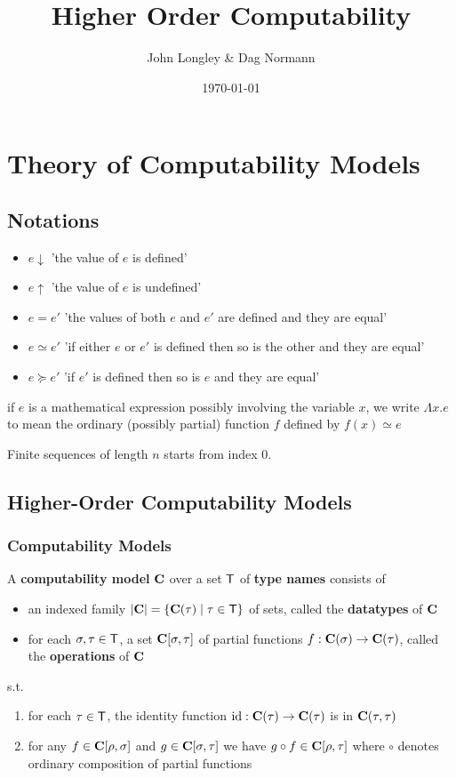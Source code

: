\documentclass[11pt]{article}
\author{John Longley \& Dag Normann}
\date{\today}
\title{Higher Order Computability}
\begin{document}
\maketitle
\tableofcontents


\section{Theory of Computability Models}
\label{sec:orga9b4bc4}
\subsection{Notations}
\label{sec:orgc508af1}
\begin{itemize}
\item \(e\downarrow\) 'the value of \(e\) is defined'
\item \(e\uparrow\) 'the value of \(e\) is undefined'
\item \(e=e'\) 'the values of both \(e\) and \(e'\) are defined and they are equal'
\item \(e\simeq e'\) 'if either \(e\) or \(e'\) is defined then so is the other and they are equal'
\item \(e\succeq e'\) 'if \(e'\) is defined then so is \(e\) and they are equal'
\end{itemize}


if \(e\) is a mathematical expression possibly involving the variable \(x\), we write \(\Lambda x.e\)
to mean the ordinary (possibly partial) function \(f\) defined by \(f(x)\simeq e\)

Finite sequences of length \(n\) starts from index 0.
\subsection{Higher-Order Computability Models}
\label{sec:orgfacab31}
\subsubsection{Computability Models}
\label{sec:org39ef3d5}
\begin{definition}[]
\label{3.1.1}
A \textbf{computability model} \(\operatorname{\textbf{C}}\)  over a set \(\textsf{T}\) of \textbf{type names} consists of
\begin{itemize}
\item an indexed family \(\abs{\bC}=\{\bC(\tau)\mid\tau\in\sfT\}\) of sets, called the \textbf{datatypes} of \(\operatorname{\textbf{C}}\)
\item for each \(\sigma,\tau\in\textsf{T}\), a set \(\operatorname{\textbf{C}}[\sigma,\tau]\) of partial functions \(f:\operatorname{\textbf{C}}(\sigma)\to\operatorname{\textbf{C}}(\tau)\), called the
\textbf{operations} of \(\operatorname{\textbf{C}}\)
\end{itemize}


s.t.
\begin{enumerate}
\item for each \(\tau\in\textsf{T}\), the identity function \(\operatorname{id}:\operatorname{\textbf{C}}(\tau)\to\operatorname{\textbf{C}}(\tau)\) is in \(\operatorname{\textbf{C}}(\tau,\tau)\)
\item for any \(f\in\operatorname{\textbf{C}}[\rho,\sigma]\) and \(g\in\operatorname{\textbf{C}}[\sigma,\tau]\) we have \(g\circ f\in\operatorname{\textbf{C}}[\rho,\tau]\) where \(\circ\) denotes ordinary
composition of partial functions
\end{enumerate}
\end{definition}
\end{document}
